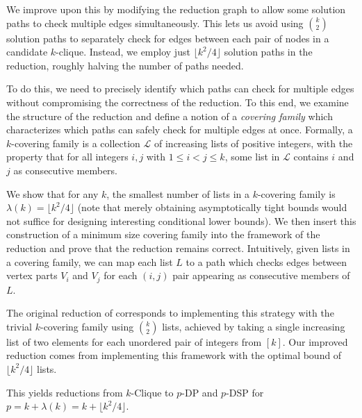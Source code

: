 \documentclass[11pt]{article}
\theoremstyle{definition}
\begin{document}
We improve upon this by modifying the reduction graph to allow some solution paths to check multiple edges simultaneously.
This lets us avoid using $\binom{k}{2}$ solution paths to separately check for edges between each pair of nodes in a candidate $k$-clique. 
Instead, we employ just $\lfloor k^2/4\rfloor$ solution paths in the reduction, roughly halving the number of paths needed. 

To do this, we need to precisely identify which paths can check for multiple edges without compromising the correctness of the reduction. 
To this end, we examine the structure of the reduction and define a notion of a \emph{covering family} which characterizes which paths can safely check for multiple edges at once. 
Formally, a $k$-covering family is a collection $\mathcal{L}$ of increasing lists of positive integers, with the property that for all integers $i,j$ with $1\le i < j\le k$, some list in $\mathcal{L}$ contains $i$ and $j$ as consecutive members.

We show that for any $k$, the smallest number of lists in a $k$-covering family is $\lambda(k)  = \lfloor k^2/4\rfloor$ (note that merely obtaining asymptotically tight bounds would not suffice for designing interesting conditional lower bounds). 
We then insert this construction of a minimum size covering family into the framework of the reduction and prove that the reduction remains correct. 
Intuitively, given lists in a covering family, we can map each list $L$ to a path  which checks edges between vertex parts $V_i$ and $V_j$ for each $(i,j)$ pair appearing as consecutive members of $L$.

The original reduction of \cite{Slivkins2010} corresponds to implementing this strategy with the trivial $k$-covering family using $\binom{k}{2}$ lists, achieved by taking a single increasing list of two elements for each unordered pair of integers from $[k]$.
Our improved reduction comes from implementing this framework with the optimal bound of $\lfloor k^2/4\rfloor$ lists.

This yields reductions from \textsf{$k$-Clique} to \textsf{$p$-DP} and \textsf{$p$-DSP} for $p= k + \lambda(k) = k + \lfloor k^2/4\rfloor$.



\end{document}
